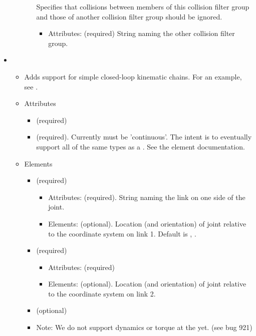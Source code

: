 \begin{itemize}
\begin{itemize}
\begin{itemize}
            Specifies that collisions between members of this collision filter
            group and those of another collision filter group should be ignored.
            \begin{itemize}
              \item Attributes:  (required)
                String naming the other collision filter group. 
            \end{itemize}
        \end{itemize}
    \end{itemize}
\item {}
\begin{itemize}
\item Adds support for simple closed-loop kinematic chains.  For an example, see .  
\item Attributes
\begin{itemize}
\item {} (required)
\item {} (required). Currently must be 'continuous'.  The intent is to eventually support all of the same types as a . See the  element documentation. 
\end{itemize}
\item Elements
\begin{itemize}
\item {} (required)
\begin{itemize}
\item Attributes:  (required). String naming the link on one side of the joint.
\item Elements:  (optional). Location (and orientation) of joint relative to the coordinate system on link 1. Default is , . 
\end{itemize}
\item {} (required)
\begin{itemize}
\item Attributes:  (required)
\item Elements:  (optional). Location (and orientation) of joint relative to the coordinate system on link 2. 
\end{itemize}
\item {} (optional) 
\item Note: We do not support dynamics or torque at the  yet. (see bug 921) 
\end{itemize}
\end{itemize}


\end{itemize}
